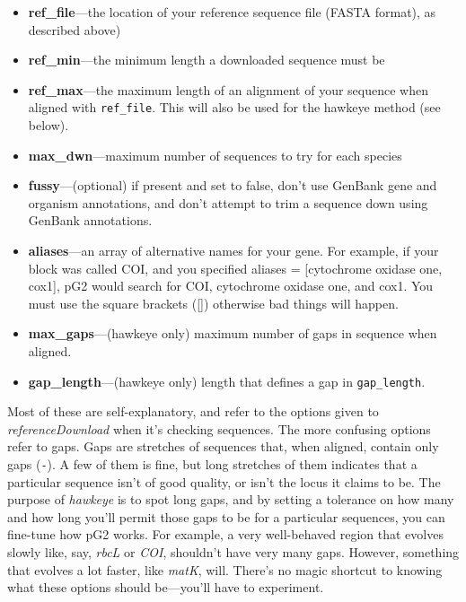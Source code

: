 \documentclass[12pt]{article}
\begin{document}
\begin{itemize}
\item \textbf{ref\_file}---the location of your reference sequence
  file (FASTA format), as described above)
\item \textbf{ref\_min}---the minimum length a downloaded sequence must be
\item \textbf{ref\_max}---the maximum length of an alignment of your
  sequence when aligned with \texttt{ref\_file}. This will also be
  used for the hawkeye method (see below).
\item \textbf{max\_dwn}---maximum number of sequences to try for each species
\item \textbf{fussy}---(optional) if present and set to false, don't
  use GenBank gene and organism annotations, and don't attempt to trim
  a sequence down using GenBank annotations.
\item \textbf{aliases}---an array of alternative names for your
  gene. For example, if your block was called COI, and you specified
  aliases = [cytochrome oxidase one, cox1], pG2 would search for COI,
  cytochrome oxidase one, and cox1. You must use the square brackets
  ([]) otherwise bad things will happen.
\item \textbf{max\_gaps}---(hawkeye only) maximum number of gaps in
  sequence when aligned.
\item \textbf{gap\_length}---(hawkeye only) length that defines a gap
  in \texttt{gap\_length}.
\end{itemize}

Most of these are self-explanatory, and refer to the options given to
\emph{referenceDownload} when it's checking sequences. The more
confusing options refer to gaps. Gaps are stretches of sequences that,
when aligned, contain only gaps (\texttt{-}). A few of them is fine,
but long stretches of them indicates that a particular sequence isn't
of good quality, or isn't the locus it claims to be. The purpose of
\emph{hawkeye} is to spot long gaps, and by setting a tolerance on how
many and how long you'll permit those gaps to be for a particular
sequences, you can fine-tune how pG2 works. For example, a very
well-behaved region that evolves slowly like, say, \emph{rbcL} or
\emph{COI}, shouldn't have very many gaps. However, something that
evolves a lot faster, like \emph{matK}, will. There's no magic
shortcut to knowing what these options should be---you'll have to
experiment.
\end{document}
